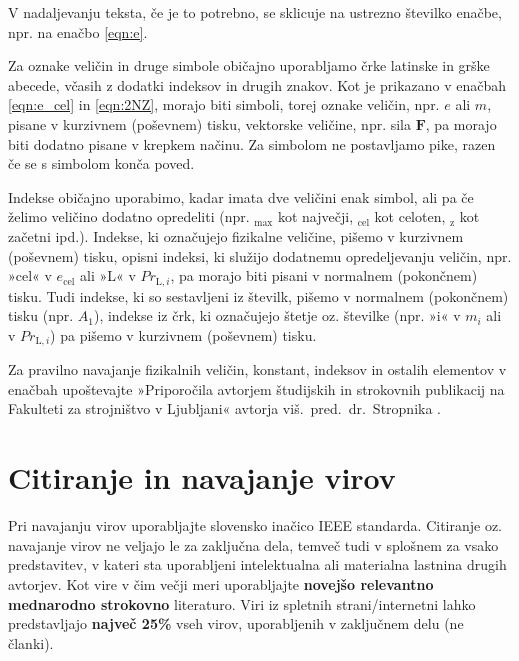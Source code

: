 V nadaljevanju teksta, če je to potrebno, se sklicuje na ustrezno številko 
enačbe, npr. na enačbo \eqref{eqn:e}.

Za oznake veličin in druge simbole običajno uporabljamo črke latinske in grške 
abecede, včasih z dodatki indeksov in drugih znakov. Kot je prikazano v enačbah 
\eqref{eqn:e_cel} in \eqref{eqn:2NZ}, morajo biti simboli, torej oznake veličin, 
npr. $e$ ali $m$, pisane v kurzivnem (poševnem) tisku, vektorske veličine, npr. sila $\bm{F}$, pa morajo biti dodatno pisane v krepkem načinu. Za simbolom ne postavljamo pike, razen če se s simbolom konča poved.

Indekse običajno uporabimo, kadar imata dve veličini enak simbol, ali pa če 
želimo veličino dodatno opredeliti (npr. $_{\text{max}}$ kot največji, 
$_{\text{cel}}$ kot celoten, $_{\text{z}}$ kot začetni ipd.). Indekse, ki 
označujejo fizikalne veličine, pišemo v kurzivnem (poševnem) tisku, opisni 
indeksi, ki služijo dodatnemu opredeljevanju veličin, npr. »cel« v 
$e_{\text{cel}}$ ali »L« v $Pr_{\text{L},i}$, pa morajo biti pisani v normalnem 
(pokončnem) tisku. Tudi indekse, ki so sestavljeni iz številk, pišemo v 
normalnem (pokončnem) tisku (npr. $A_1$), indekse iz črk, ki označujejo štetje 
oz. številke (npr. »i« v $m_i$ ali v $Pr_{\text{L},i}$) pa pišemo v kurzivnem 
(poševnem) tisku.

Za pravilno navajanje fizikalnih veličin, konstant, indeksov in ostalih elementov v enačbah upoštevajte »Priporočila avtorjem študijskih in strokovnih publikacij na Fakulteti za strojništvo v Ljubljani« avtorja viš.~pred.~dr.~Stropnika \cite{stropnik_1997}.

\section{Citiranje in navajanje virov}\label{sec:citiranje}

Pri navajanju virov uporabljajte slovensko inačico IEEE standarda. Citiranje 
oz. navajanje virov ne veljajo le za zaključna dela, temveč tudi v splošnem za 
vsako predstavitev, v kateri sta uporabljeni intelektualna ali materialna 
lastnina drugih avtorjev. Kot vire v čim večji meri uporabljajte 
\textbf{novejšo relevantno mednarodno strokovno} literaturo. Viri iz spletnih 
strani/internetni lahko predstavljajo \textbf{največ 25\%} vseh virov, 
uporabljenih v zaključnem delu (ne članki).

